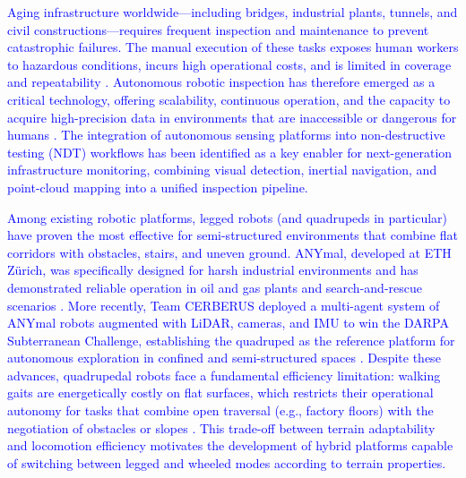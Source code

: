 \documentclass[preprint,12pt]{elsarticle}
\newcommand{\revblue}[1]{\textcolor{blue}{#1}}
\begin{document}
\revblue{Aging infrastructure worldwide---including bridges, industrial plants, tunnels, and civil constructions---requires frequent inspection and maintenance to prevent catastrophic failures. The manual execution of these tasks exposes human workers to hazardous conditions, incurs high operational costs, and is limited in coverage and repeatability \citep{Halder2023Construction,Wang2025Autonomous}. Autonomous robotic inspection has therefore emerged as a critical technology, offering scalability, continuous operation, and the capacity to acquire high-precision data in environments that are inaccessible or dangerous for humans \citep{Halder2025Crack}. The integration of autonomous sensing platforms into non-destructive testing (NDT) workflows has been identified as a key enabler for next-generation infrastructure monitoring, combining visual detection, inertial navigation, and point-cloud mapping into a unified inspection pipeline.}

\revblue{Among existing robotic platforms, legged robots (and quadrupeds in particular) have proven the most effective for semi-structured environments that combine flat corridors with obstacles, stairs, and uneven ground. ANYmal, developed at ETH Z\"{u}rich, was specifically designed for harsh industrial environments and has demonstrated reliable operation in oil and gas plants and search-and-rescue scenarios \citep{Hutter2017ANYmal}. More recently, Team CERBERUS deployed a multi-agent system of ANYmal robots augmented with LiDAR, cameras, and IMU to win the DARPA Subterranean Challenge, establishing the quadruped as the reference platform for autonomous exploration in confined and semi-structured spaces \citep{Tranzatto2022CERBERUS}. Despite these advances, quadrupedal robots face a fundamental efficiency limitation: walking gaits are energetically costly on flat surfaces, which restricts their operational autonomy for tasks that combine open traversal (e.g., factory floors) with the negotiation of obstacles or slopes \citep{Vogel2024Ladder}. This trade-off between terrain adaptability and locomotion efficiency motivates the development of hybrid platforms capable of switching between legged and wheeled modes according to terrain properties.}
\end{document}
